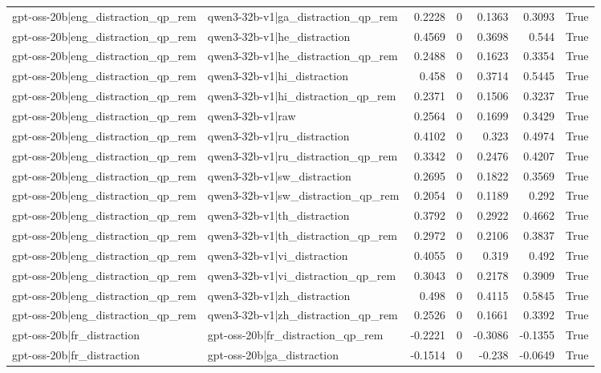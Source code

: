 \begin{table}
\begin{tabular}{l l r r r r l}
gpt-oss-20b|eng_distraction_qp_rem & qwen3-32b-v1|ga_distraction_qp_rem & 0.2228 & 0 & 0.1363 & 0.3093 & True \\
gpt-oss-20b|eng_distraction_qp_rem & qwen3-32b-v1|he_distraction & 0.4569 & 0 & 0.3698 & 0.544 & True \\
gpt-oss-20b|eng_distraction_qp_rem & qwen3-32b-v1|he_distraction_qp_rem & 0.2488 & 0 & 0.1623 & 0.3354 & True \\
gpt-oss-20b|eng_distraction_qp_rem & qwen3-32b-v1|hi_distraction & 0.458 & 0 & 0.3714 & 0.5445 & True \\
gpt-oss-20b|eng_distraction_qp_rem & qwen3-32b-v1|hi_distraction_qp_rem & 0.2371 & 0 & 0.1506 & 0.3237 & True \\
gpt-oss-20b|eng_distraction_qp_rem & qwen3-32b-v1|raw & 0.2564 & 0 & 0.1699 & 0.3429 & True \\
gpt-oss-20b|eng_distraction_qp_rem & qwen3-32b-v1|ru_distraction & 0.4102 & 0 & 0.323 & 0.4974 & True \\
gpt-oss-20b|eng_distraction_qp_rem & qwen3-32b-v1|ru_distraction_qp_rem & 0.3342 & 0 & 0.2476 & 0.4207 & True \\
gpt-oss-20b|eng_distraction_qp_rem & qwen3-32b-v1|sw_distraction & 0.2695 & 0 & 0.1822 & 0.3569 & True \\
gpt-oss-20b|eng_distraction_qp_rem & qwen3-32b-v1|sw_distraction_qp_rem & 0.2054 & 0 & 0.1189 & 0.292 & True \\
gpt-oss-20b|eng_distraction_qp_rem & qwen3-32b-v1|th_distraction & 0.3792 & 0 & 0.2922 & 0.4662 & True \\
gpt-oss-20b|eng_distraction_qp_rem & qwen3-32b-v1|th_distraction_qp_rem & 0.2972 & 0 & 0.2106 & 0.3837 & True \\
gpt-oss-20b|eng_distraction_qp_rem & qwen3-32b-v1|vi_distraction & 0.4055 & 0 & 0.319 & 0.492 & True \\
gpt-oss-20b|eng_distraction_qp_rem & qwen3-32b-v1|vi_distraction_qp_rem & 0.3043 & 0 & 0.2178 & 0.3909 & True \\
gpt-oss-20b|eng_distraction_qp_rem & qwen3-32b-v1|zh_distraction & 0.498 & 0 & 0.4115 & 0.5845 & True \\
gpt-oss-20b|eng_distraction_qp_rem & qwen3-32b-v1|zh_distraction_qp_rem & 0.2526 & 0 & 0.1661 & 0.3392 & True \\
gpt-oss-20b|fr_distraction & gpt-oss-20b|fr_distraction_qp_rem & -0.2221 & 0 & -0.3086 & -0.1355 & True \\
gpt-oss-20b|fr_distraction & gpt-oss-20b|ga_distraction & -0.1514 & 0 & -0.238 & -0.0649 & True \\

\end{tabular}
\end{table}
